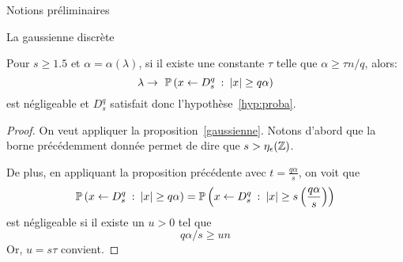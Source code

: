 \begin{section}{Notions préliminaires}
\begin{subsection}{La gaussienne discrète}
\begin{prop}
\label{gaussienne_alpha}
Pour $s \geq 1.5$ et $\alpha = \alpha(\lambda)$, si il existe une constante $\tau$
telle que $\alpha \geq \tau n/q$, alors:
\[\lambda \rightarrow  \PP\left(x\leftarrow D^q_s\: : \: |x|\geq q \alpha \right)\]	
est négligeable et $D^q_s$ satisfait donc l'hypothèse~\ref{hyp:proba}.
\end{prop}
\begin{proof}
On veut appliquer la proposition~\ref{gaussienne}.
Notons d'abord que la borne précédemment donnée 
permet de dire que $s > \eta_{\epsilon}(\mathbb{Z})$.

De plus, en appliquant la proposition précédente avec $t = \frac{q\alpha}{s}$, on voit que 
\begin{align*}
\mathbb{P}\left(x\leftarrow D^q_s\: : \: |x|\geq q \alpha \right) =
\mathbb{P}\left(x\leftarrow D^q_s\: : \: |x|\geq s \left(\frac{q \alpha}{s}\right)  \right)
\end{align*}
est négligeable si il
existe un $u > 0$ tel que
\[q \alpha / s \geq u n\]
Or, $u = s\tau$ convient.
\end{proof}

	\end{subsection} %
\end{section}
